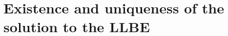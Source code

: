\documentclass[11pt,reqno]{amsart}
\theoremstyle{definition}
\newtheorem{theorem}{Theorem}[section]
\numberwithin{equation}{section}
\newcommand{\bff}{\boldsymbol}
\newcommand{\bb}{\mathbb}
\newcommand{\norm}[2]{\left\|{#1}\right\|_{#2}}
\begin{document}

\section{Existence and uniqueness of the solution to the LLBE}\label{sec:exist LLBE}
\end{document}

